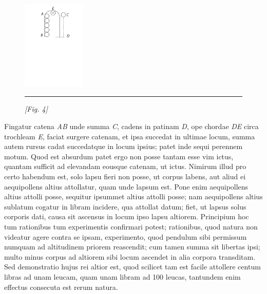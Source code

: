 \pstart  
\begin{figure}
\includegraphics[width=0.27\textwidth]{images/lh0351303_035r-d4.pdf}\\
\rule[0cm]{12mm}{0cm}\textit{[Fig. 4]}
\end{figure}
Fingatur catena  \textit{AB} unde summa \textit{C}, cadens in patinam \textit{D}, ope chordae \textit{DE} circa trochleam \textit{E}, faciat surgere catenam, et ipsa succedat in ultimae locum, summa autem rursus cadat succedatque in locum ipsius; patet inde sequi perennem motum. Quod est absurdum patet ergo non posse tantam esse vim ictus, quantam sufficit ad elevandam eousque catenam, ut  ictus. Nimirum illud pro certo habendum est, solo lapsu fieri non posse, ut corpus labens, aut aliud ei aequipollens altius attollatur, quam unde lapsum est. Pone enim aequipollens altius attolli posse, sequitur ipsummet altius attolli posse; nam aequipollens altius sublatum cogatur in libram incidere, qua attollat datum; fiet, ut lapsus solus corporis dati, causa sit ascensus in locum ipso lapsu altiorem. Principium hoc tum rationibus tum experimentis confirmari potest; rationibus, quod natura non videatur agere contra se ipsam, experimento, quod pendulum sibi permissum numquam ad altitudinem priorem reascendit; cum tamen summa sit libertas ipsi; multo minus corpus ad altiorem sibi locum ascendet  in alia corpora transditam. Sed demonstratio hujus rei altior est, quod scilicet tam est facile attollere centum libras ad unam leucam, quam unam libram ad 100 leucas, tantundem enim effectus consecuta est rerum natura.\pend
